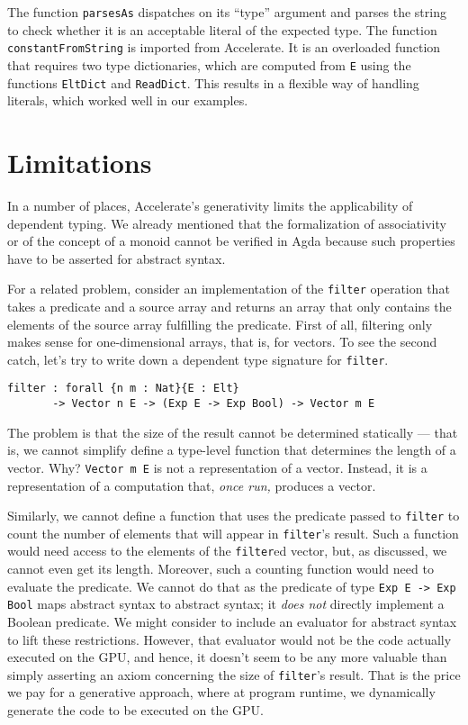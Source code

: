 \documentclass{llncs}
\begin{document}
The function \texttt{parsesAs} dispatches on its ``type'' argument and
parses the string to check whether it is an acceptable literal of the expected type. The
function \texttt{constantFromString} is imported from Accelerate.
It is an overloaded function that requires two type dictionaries,
which are computed from \texttt{E} using the functions \texttt{EltDict}
and \texttt{ReadDict}. 
This results in a flexible way of handling literals, which
worked well in our examples.

\section{Limitations}
\label{sec:limitations}

In a number of places, Accelerate's generativity limits the
applicability of dependent typing. We already mentioned that the
formalization of associativity or of the concept of a monoid cannot be
verified in Agda because such properties have to be asserted for abstract syntax.

For a related problem, consider an implementation of the \texttt{filter}
operation that takes a predicate and a source array and returns an
array that only contains the elements of the source array fulfilling
the predicate.  First of all, filtering only makes sense for
one-dimensional arrays, that is, for vectors. To see the second catch,
let's try to write down a dependent type signature for \texttt{filter}.
\begin{verbatim}
filter : forall {n m : Nat}{E : Elt}
       -> Vector n E -> (Exp E -> Exp Bool) -> Vector m E
\end{verbatim}
The problem is that the size of the result cannot be determined statically --- that is,
we cannot simplify define a type-level function that determines the length of a vector.
Why? \texttt{Vector m E} is not a representation of a vector. Instead, it is a representation
of a computation that, \emph{once run,} produces a vector. 

Similarly, we cannot define a function that uses the predicate passed to \texttt{filter} to 
count the number of elements that will appear in \texttt{filter}'s result. Such a function would
need access to the elements of the \texttt{filter}ed vector, but, as discussed, we cannot even get
its length. Moreover, such a counting function would need to evaluate the predicate. We cannot do
that as the predicate of type \texttt{Exp E -> Exp Bool} maps abstract syntax to abstract syntax;
it \emph{does not} directly implement a Boolean predicate. We might consider to include an evaluator
for abstract syntax to lift these restrictions. However, that evaluator would not be the code
actually executed on the GPU, and hence, it doesn't seem to be any more valuable than simply
asserting an axiom concerning the size of \texttt{filter}'s result.
That is the price we pay for a generative approach, where at program runtime, we dynamically
generate the code to be executed on the GPU.
\end{document}
